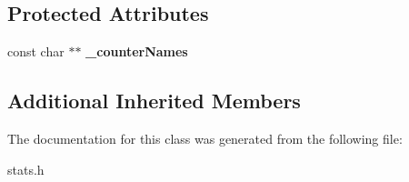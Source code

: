 \subsection*{Protected Attributes}
\begin{DoxyCompactItemize}
\item 
\hypertarget{classVectorStat_a5c7d25f846e6a806719791feedfd1776}{const char $\ast$$\ast$ {\bfseries \-\_\-counter\-Names}}\label{classVectorStat_a5c7d25f846e6a806719791feedfd1776}

\end{DoxyCompactItemize}
\subsection*{Additional Inherited Members}


The documentation for this class was generated from the following file\-:\begin{DoxyCompactItemize}
\item 
stats.\-h\end{DoxyCompactItemize}
